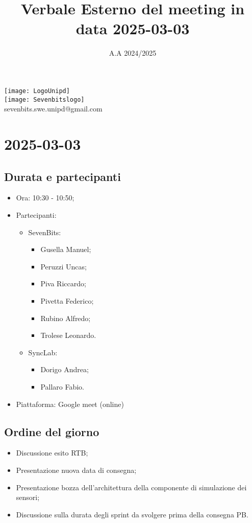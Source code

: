 \documentclass[10pt]{article}
\title{Verbale Esterno del meeting in data 2025-03-03} %
\date{A.A 2024/2025}
\begin{document}
\maketitle
\center 
\texttt{[image: LogoUnipd]}\\
\texttt{[image: Sevenbitslogo]}\\
sevenbits.swe.unipd@gmail.com\\
\vspace{2mm}

\newpage
\raggedright
\tableofcontents

\newpage
\section{2025-03-03} %
\subsection{Durata e partecipanti}
\begin{itemize}
\item Ora: 10:30 - 10:50; %
\item Partecipanti: 	
	\begin{itemize}
        \item SevenBits:
        \begin{itemize}
            \item Gusella Manuel;
            \item Peruzzi Uncas;
            \item Piva Riccardo;
            \item Pivetta Federico;
            \item Rubino Alfredo;
            \item Trolese Leonardo.
        \end{itemize}
            \item SyncLab:
            \begin{itemize}
                \item Dorigo Andrea;
                \item Pallaro Fabio.
	    \end{itemize}
	\end{itemize}
\item Piattaforma: Google meet (online)
\end{itemize}

\subsection{Ordine del giorno}
\begin{itemize}
    \item Discussione esito RTB;
    \item Presentazione nuova data di consegna;
    \item Presentazione bozza dell'architettura della componente di simulazione dei sensori;
    \item Discussione sulla durata degli sprint da svolgere prima della consegna PB.
\end{itemize}
\end{document}
